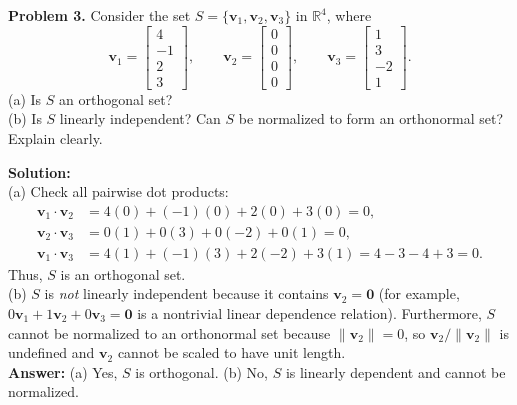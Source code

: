 \documentclass[11pt, letterpaper]{article}
\theoremstyle{definition}
\theoremstyle{remark}
\begin{document}
\textbf{Problem 3.} Consider the set $S = \{\mathbf{v}_1, \mathbf{v}_2, \mathbf{v}_3\}$ in $\mathbb{R}^4$, where
\[
\mathbf{v}_1 = \begin{bmatrix} 4 \\ -1 \\ 2 \\ 3 \end{bmatrix}, \qquad
\mathbf{v}_2 = \begin{bmatrix} 0 \\ 0 \\ 0 \\ 0 \end{bmatrix}, \qquad
\mathbf{v}_3 = \begin{bmatrix} 1 \\ 3 \\ -2 \\ 1 \end{bmatrix}.
\]
(a) Is $S$ an orthogonal set? \\
(b) Is $S$ linearly independent? Can $S$ be normalized to form an orthonormal set? Explain clearly.

\textbf{Solution:} \\
(a) Check all pairwise dot products:
\begin{align*}
\mathbf{v}_1 \cdot \mathbf{v}_2 &= 4(0) + (-1)(0) + 2(0) + 3(0) = 0, \\
\mathbf{v}_2 \cdot \mathbf{v}_3 &= 0(1) + 0(3) + 0(-2) + 0(1) = 0, \\
\mathbf{v}_1 \cdot \mathbf{v}_3 &= 4(1) + (-1)(3) + 2(-2) + 3(1) = 4 - 3 - 4 + 3 = 0.
\end{align*}
Thus, $S$ is an orthogonal set. \\
(b) $S$ is \textit{not} linearly independent because it contains $\mathbf{v}_2 = \mathbf{0}$ (for example, $0\mathbf{v}_1 + 1\mathbf{v}_2 + 0\mathbf{v}_3 = \mathbf{0}$ is a nontrivial linear dependence relation). Furthermore, $S$ cannot be normalized to an orthonormal set because $\|\mathbf{v}_2\| = 0$, so $\mathbf{v}_2 / \|\mathbf{v}_2\|$ is undefined and $\mathbf{v}_2$ cannot be scaled to have unit length. \\
\textbf{Answer:} (a) Yes, $S$ is orthogonal. (b) No, $S$ is linearly dependent and cannot be normalized.
\end{document}
